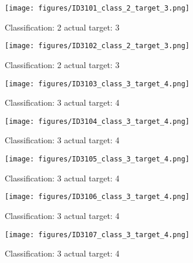\begin{figure}[h!]
\begin{center}
\texttt{[image: figures/ID3101\_class\_2\_target\_3.png]}
\end{center}
\caption{ Classification: 2 actual target: 3}
\label{fig:ID3101_class_2_target_3}
\end{figure}
\begin{figure}[h!]
\begin{center}
\texttt{[image: figures/ID3102\_class\_2\_target\_3.png]}
\end{center}
\caption{ Classification: 2 actual target: 3}
\label{fig:ID3102_class_2_target_3}
\end{figure}
\begin{figure}[h!]
\begin{center}
\texttt{[image: figures/ID3103\_class\_3\_target\_4.png]}
\end{center}
\caption{ Classification: 3 actual target: 4}
\label{fig:ID3103_class_3_target_4}
\end{figure}
\begin{figure}[h!]
\begin{center}
\texttt{[image: figures/ID3104\_class\_3\_target\_4.png]}
\end{center}
\caption{ Classification: 3 actual target: 4}
\label{fig:ID3104_class_3_target_4}
\end{figure}
\begin{figure}[h!]
\begin{center}
\texttt{[image: figures/ID3105\_class\_3\_target\_4.png]}
\end{center}
\caption{ Classification: 3 actual target: 4}
\label{fig:ID3105_class_3_target_4}
\end{figure}
\begin{figure}[h!]
\begin{center}
\texttt{[image: figures/ID3106\_class\_3\_target\_4.png]}
\end{center}
\caption{ Classification: 3 actual target: 4}
\label{fig:ID3106_class_3_target_4}
\end{figure}
\begin{figure}[h!]
\begin{center}
\texttt{[image: figures/ID3107\_class\_3\_target\_4.png]}
\end{center}
\caption{ Classification: 3 actual target: 4}
\label{fig:ID3107_class_3_target_4}
\end{figure}
